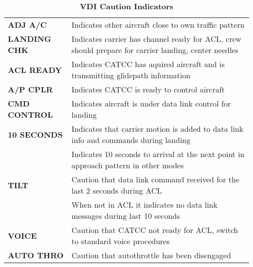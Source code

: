 \documentclass[fontSpartan]{TechCheck}
\begin{document}

	\begin{table}[h]
		\caption{\textbf{VDI Caution Indicators}}
		\label{tab:vdicautionind}
		\begin{tabular}{p{2.8cm} | p{9cm}}
			\toprule
			\blue{Light} & \blue{Description} \\
			\midrule
			\textbf{ADJ A/C} & Indicates other aircraft close to own traffic pattern \\
			\midrule
			\textbf{LANDING CHK} & Indicates carrier has channel ready for ACL, crew should prepare for carrier landing, center needles \\
			\midrule
			\textbf{ACL READY} & Indicates CATCC has aquired aircraft and is transmitting glidepath information \\
			\midrule
			\textbf{A/P CPLR} & Indicates CATCC is ready to control aircraft \\
			\midrule
			\textbf{CMD CONTROL} & Indicates aircraft is under data link control for landing \\
			\midrule
			\textbf{10 SECONDS} & Indicates that carrier motion is added to data link info and commands during landing \\
			& Indicates 10 seconds to arrival at the next point in approach pattern in other modes \\
			\midrule
			\textbf{TILT} & Caution that data link command received for the last 2 seconds during ACL \\
			& When not in ACL it indicates no data link messages during last 10 seconds \\
			\midrule
			\textbf{VOICE} & Caution that CATCC not ready for ACL, switch to standard voice procedures \\
			\midrule
			\textbf{AUTO THRO} & Caution that autothrottle has been disengaged \\

\end{tabular}
\end{table}
\end{document}
